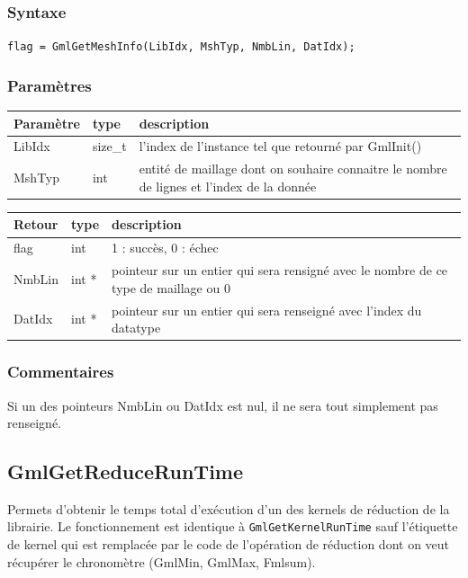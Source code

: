 \documentclass[a4paper,12pt]{article}
\begin{document}
\subsubsection*{Syntaxe}

{\tt flag = GmlGetMeshInfo(LibIdx, MshTyp, NmbLin, DatIdx);}

\subsubsection*{Paramètres}

\begin{tabular}{|m{2cm}|m{1.5cm}|m{10.5cm}|}
\hline
Paramètre  & type    & description \\
\hline
LibIdx     & size\_t & l'index de l'instance tel que retourné par GmlInit() \\
\hline
MshTyp     & int     & entité de maillage dont on souhaire connaitre le nombre de lignes et l'index de la donnée \\
\hline
\end{tabular}

\medskip

\begin{tabular}{|m{2cm}|m{1.5cm}|m{10.5cm}|}
\hline
Retour     & type   & description \\
\hline
flag       & int    & 1 : succès, 0 : échec \\
\hline
NmbLin     & int *   & pointeur sur un entier qui sera rensigné avec le nombre de ce type de maillage ou 0 \\
\hline
DatIdx     & int *   & pointeur sur un entier qui sera renseigné avec l'index du datatype \\
\hline
\end{tabular}

\subsubsection*{Commentaires}

Si un des pointeurs NmbLin ou DatIdx est nul, il ne sera tout simplement pas renseigné.


\subsection{GmlGetReduceRunTime}

Permets d'obtenir le temps total d'exécution d'un des kernels de réduction de la librairie.
Le fonctionnement est identique à {\tt GmlGetKernelRunTime} sauf l'étiquette de kernel qui est remplacée par le code de l'opération de réduction dont on veut récupérer le chronomètre (GmlMin, GmlMax, Fmlsum).
\end{document}
